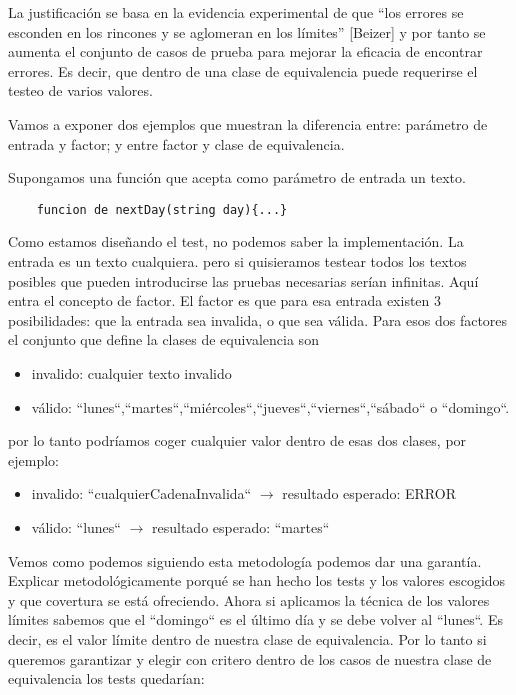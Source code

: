 La justificación se basa en la evidencia experimental de que “los errores se esconden en los rincones y se aglomeran en los límites” [Beizer] y por tanto se aumenta el conjunto de casos de prueba para mejorar la eficacia de encontrar errores. Es decir, que dentro de una clase de equivalencia puede requerirse el testeo de varios valores.

Vamos a exponer dos ejemplos que muestran la diferencia entre: parámetro de entrada y factor; y entre factor y clase de equivalencia.

Supongamos una función que acepta como parámetro de entrada un texto.

\begin{verbatim}
    funcion de nextDay(string day){...}
\end{verbatim}

Como estamos diseñando el test, no podemos saber la implementación. La entrada es un texto cualquiera. pero si quisieramos testear todos los textos posibles que pueden introducirse las pruebas necesarias serían infinitas. Aquí entra el concepto de factor. El factor es que para esa entrada existen 3 posibilidades: que la entrada sea invalida, o que sea válida. Para esos dos factores el conjunto que define la clases de equivalencia son

\begin{itemize}
    \item invalido: cualquier texto invalido
    \item válido: “lunes“,“martes“,“miércoles“,“jueves“,“viernes“,“sábado“ o “domingo“.
\end{itemize}

por lo tanto podríamos coger cualquier valor dentro de esas dos clases, por ejemplo:

\begin{itemize}
    \item invalido: “cualquierCadenaInvalida“ \(\longrightarrow\) resultado esperado: ERROR
    \item válido: “lunes“ \(\longrightarrow\) resultado esperado: “martes“
\end{itemize}

Vemos como podemos siguiendo esta metodología podemos dar una garantía. Explicar metodológicamente porqué se han hecho los tests y los valores escogidos y que covertura se está ofreciendo. Ahora si aplicamos la técnica de los valores límites sabemos que el “domingo“ es el último día y se debe volver al “lunes“. Es decir, es el valor límite dentro de nuestra clase de equivalencia. Por lo tanto si queremos garantizar y elegir con critero dentro de los casos de nuestra clase de equivalencia los tests quedarían:


